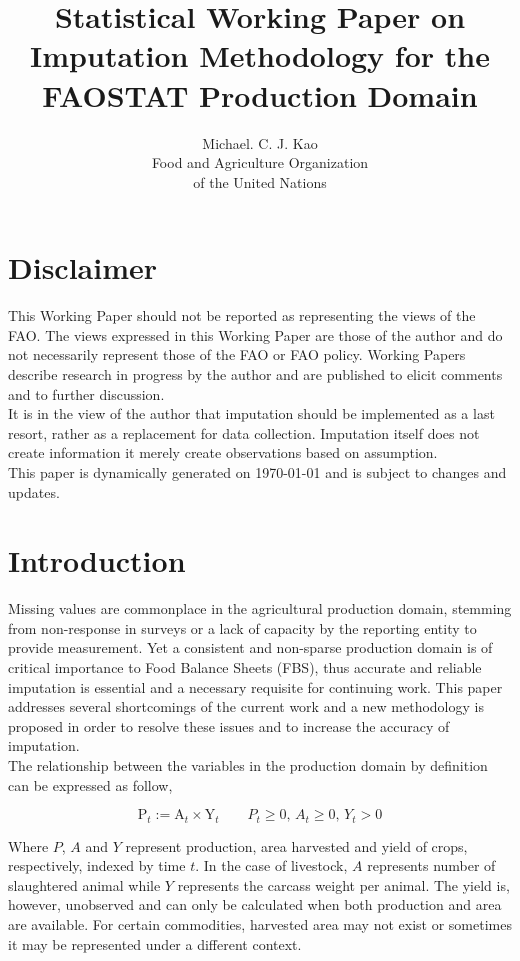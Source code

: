\documentclass[nojss]{jss}\usepackage[]{graphicx}\usepackage[]{color}
\title{\bf Statistical Working Paper on Imputation Methodology for the
  FAOSTAT Production Domain}
\author{Michael. C. J. Kao\\ Food and Agriculture Organization \\ of
  the United Nations}
\begin{document}
\section*{Disclaimer}
This Working Paper should not be reported as representing the views of
the FAO. The views expressed in this Working Paper are those of the
author and do not necessarily represent those of the FAO or FAO
policy. Working Papers describe research in progress by the author and
are published to elicit comments and to further discussion.\\

It is in the view of the author that imputation should be implemented
as a last resort, rather as a replacement for data
collection. Imputation itself does not create information it merely
create observations based on assumption. \\

This paper is dynamically generated on \today{} and is subject to
changes and updates.

\section{Introduction}
Missing values are commonplace in the agricultural production domain,
stemming from non-response in surveys or a lack of capacity by the
reporting entity to provide measurement. Yet a consistent and
non-sparse production domain is of critical importance to Food Balance
Sheets (FBS), thus accurate and reliable imputation is essential and a
necessary requisite for continuing work. This paper addresses several
shortcomings of the current work and a new methodology is proposed in
order to resolve these issues and to increase the accuracy of
imputation.\\

The relationship between the variables in the production domain by
definition can be expressed as follow,

\begin{equation}
  \label{eq:identity}
  \text{P}_t := \text{A}_t \times \text{Y}_t \quad\quad P_t \ge 0,\, A_t
  \ge 0,\, Y_t > 0
\end{equation}


Where $P$, $A$ and $Y$ represent production, area harvested and yield
of crops, respectively, indexed by time $t$. In the case of livestock,
$A$ represents number of slaughtered animal while $Y$ represents the
carcass weight per animal. The yield is, however, unobserved and can
only be calculated when both production and area are available. For
certain commodities, harvested area may not exist or sometimes it may
be represented under a different context.\\
\end{document}
